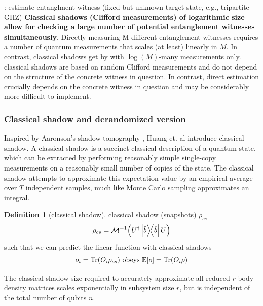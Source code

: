\documentclass[
aps,
pra,
floatfix,
]{revtex4-2}
\theoremstyle{plain}
\theoremstyle{definition}
\newtheorem{definition}{Definition}
\newtheorem{remark}{Remark}
\newcommand{\dm}{\rho}
\begin{document}
 \cite{huangPredictingManyProperties2020}: estimate entanglment witness (fixed but unknown target state, e.g., tripartite GHZ)
\textbf{Classical shadows (Clifford measurements) of logarithmic size allow for checking a large number of potential entanglement witnesses simultaneously}.
Directly measuring M diﬀerent entanglement witnesses requires a number of quantum measurements that scales (at least) linearly in $M$. In contrast, classical shadows get by with $\log(M)$-many measurements only.
classical shadows are based on random Clifford measurements and do not depend on the structure of the concrete witness in question. In contrast, direct estimation crucially depends on the concrete witness in question and may be considerably more diﬃcult to implement.

\subsubsection{Classical shadow and derandomized version}\label{sec:classical_shadow}
Inspired by Aaronson's shadow tomography \cite{aaronsonShadowTomographyQuantum2018}, Huang et. al \cite{huangPredictingManyProperties2020} introduce classical shadow.
A classical shadow is a succinct classical description of a quantum state, which can be extracted by performing reasonably simple single-copy measurements on a reasonably small number of copies of the state.
The classical shadow attempts to approximate this expectation value by an empirical average over $T$ independent samples, much like Monte Carlo sampling approximates an integral.
\begin{definition}[classical shadow]\label{def:classical_shadow}
	classical shadow (snapshots) $\dm_{cs}$
	\begin{equation}
		\dm_{cs} = \mathcal{M}^{-1} \qty(U^\dagger \op{\hat{b}} U)
	\end{equation}
	such that we can predict the linear function with classical shadows
	\begin{equation}
		o_i = \Tr(O_i \dm_{cs})
		\text{ obeys }
		\expectation[o] =\Tr(O_i \dm)
	\end{equation}
\end{definition}
The classical shadow size required to accurately approximate all reduced $r$-body density matrices scales exponentially in subsystem size $r$, but is independent of the total number of qubits $n$.
\end{document}
